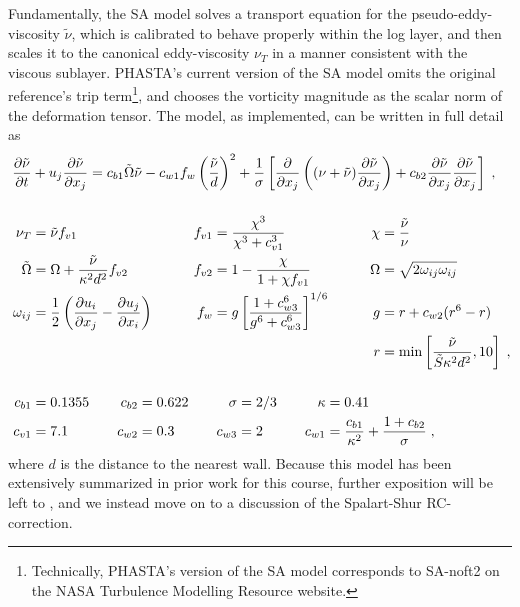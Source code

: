 \documentclass[11pt]{article}
\begin{document}
Fundamentally, the SA model solves a transport equation for the pseudo-eddy-viscosity $\tilde{\nu}$, which is calibrated to behave properly within the log layer, and then scales it to the canonical eddy-viscosity $\nu_T$ in a manner consistent with the viscous sublayer. PHASTA's current version of the SA model omits the original reference's trip term\footnote{Technically, PHASTA's version of the SA model corresponds to SA-noft2 on the NASA Turbulence Modelling Resource website.}, and chooses the vorticity magnitude as the scalar norm of the deformation tensor. The model, as implemented, can be written in full detail as
\begin{align}
	\phantom{W_{ij}}
	&\begin{aligned}
		\mathllap{\pp{\tilde{\nu}}{t}}
		&+ u_j \pp{\tilde{\nu}}{x_j}
		=
		c_{b1} \tilde{\Omega} \tilde{\nu}
		-
		c_{w1} f_w \left( \frac{\tilde{\nu}}{d} \right)^2
		+
		\frac{1}{\sigma} 
		\left[
		\pp{}{x_j}
			\left( (\nu + \tilde{\nu}) \pp{\tilde{\nu}}{x_j} \right)
			+ c_{b2} \pp{\tilde{\nu}}{x_j} \pp{\tilde{\nu}}{x_j}
		\right]
		\;,
		\label{eq:SA_transport}
	\end{aligned} \\[0.5cm]
	&\begin{aligned}
		\mathllap{\nu_T} &= \tilde{\nu} f_{v1}
		&\qquad
		f_{v1} &= \frac{\chi^3}{\chi^3 + c_{v1}^3}
		&\qquad
		\chi &= \frac{\tilde{\nu}}{\nu}
		\\
		\mathllap{\tilde{\Omega}} &= \Omega + \frac{\tilde{\nu}}{\kappa^2 d^2} f_{v2}
		&\qquad
		f_{v2} &= 1 - \frac{\chi}{1 + \chi f_{v1}}
		&\qquad
		\Omega &= \sqrt{2 \omega_{ij} \omega_{ij}}
		\\
		\mathllap{\omega_{ij}} &= \frac{1}{2} \left( \pp{u_i}{x_j} - \pp{u_j}{x_i} \right)
		&\qquad
		f_w &= g \left[ \frac{1 + c_{w3}^6}{g^6 + c_{w3}^6} \right]^{1/6}
		&\qquad
		g &= r + c_{w2}(r^6 - r)
		\\
		&&&&
		r &= \min \left[ \frac{\tilde{\nu}}{\tilde{S} \kappa^2 d^2}, 10 \right]
		\;,
		\label{eq:SA_definitions}
	\end{aligned} \\[0.5cm]
	&\begin{aligned}
		\mathllap{c_{b1}} &= 0.1355
		&\quad
		c_{b2} &= 0.622
		&\quad
		\sigma &= 2/3
		&\quad
		\kappa &= 0.41
		\\
		\mathllap{c_{v1}} &= 7.1
		&\quad
		c_{w2} &= 0.3
		&\quad
		c_{w3} &= 2
		&\quad
		c_{w1} &= \frac{c_{b1}}{\kappa^2} + \frac{1 + c_{b2}}{\sigma}
		\;,
		\label{eq:SA_constants}
	\end{aligned}
\end{align}
where $d$ is the distance to the nearest wall. Because this model has been extensively summarized in prior work for this course, further exposition will be left to \citet{spalart1992}, and we instead move on to a discussion of the Spalart-Shur RC-correction.
\end{document}
